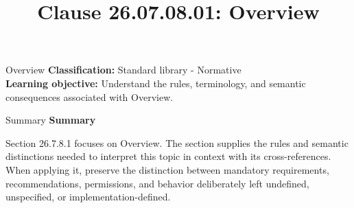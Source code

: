 \documentclass[10pt,letterpaper]{article}
\title{Clause 26.07.08.01: Overview}
\author{}
\date{}
\begin{document}
\maketitle
\begin{CornellOverviewBox}{Overview}
\textbf{Classification:} Standard library - Normative\\[2pt]
\textbf{Learning objective:} Understand the rules, terminology, and semantic consequences associated with Overview.
\end{CornellOverviewBox}\begin{CornellSummaryBox}{Summary}
{\sffamily\bfseries\color{Accent} Summary}\par\vspace{3pt}Section 26.7.8.1 focuses on Overview. The section supplies the rules and semantic distinctions needed to interpret this topic in context with its cross-references. When applying it, preserve the distinction between mandatory requirements, recommendations, permissions, and behavior deliberately left undefined, unspecified, or implementation-defined.
\end{CornellSummaryBox}
\end{document}
